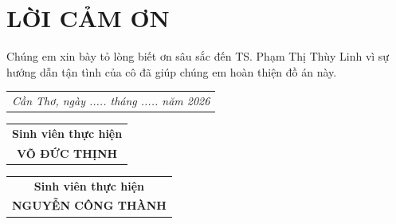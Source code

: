 \chapter*{LỜI CẢM ƠN}
\vspace{-15pt} 

Chúng em xin bày tỏ lòng biết ơn sâu sắc đến TS. Phạm Thị Thùy Linh vì sự hướng dẫn tận tình của cô đã giúp chúng em hoàn thiện đồ án này.

\vfill 

\noindent\hfill
\begin{tabular}{@{}c@{}}
    \textit{Cần Thơ, ngày ..... tháng ..... năm 2026}
\end{tabular}

\vspace{0.2cm}

\noindent
\begin{tabular}{@{}c@{}}
    \textbf{Sinh viên thực hiện} \\[2cm]
    \textbf{VÕ ĐỨC THỊNH}
\end{tabular}
\hfill
\begin{tabular}{@{}c@{}}
    \textbf{Sinh viên thực hiện} \\[2cm]
    \textbf{NGUYỄN CÔNG THÀNH}
\end{tabular}